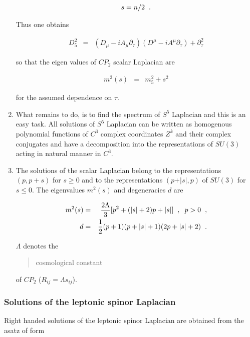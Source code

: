 \documentclass[10pt,epsf]{article}
\begin{document}
\begin{enumerate}
\begin{eqnarray}
 s=n/2\hspace{.2cm} .
 \end{eqnarray}
 
\noindent Thus one obtains

\begin{eqnarray} 
D^2_5 &=& (D_{\mu}- iA_{\mu}\partial_{\tau})(D^{\mu}- iA^{\mu}\partial_{\tau}) +\partial_{\tau}^2 
\end{eqnarray}

\noindent so that the eigen values of $CP_2$ scalar Laplacian are

\begin{eqnarray} m^2(s)&=& m_5^2 +s^2 
\end{eqnarray} 

\noindent for the assumed dependence on $\tau$.

\item What remains to do,  is to find the spectrum of $S^5$ Laplacian and this is an easy task.  All solutions of $S^5$ Laplacian can be written as homogenous polynomial functions of $C^3$ complex coordinates $Z^k$ and their complex conjugates and have a decomposition into the representations of $SU(3)$  acting in natural manner in $C^3$.



\item The solutions of the scalar Laplacian belong to the representations $(p,p+s)$ for $s\geq 0$ and to the representations $(p+ \vert s\vert, p)$ of $SU(3)$ for $s\leq 0$.  The eigenvalues  $m^2 (s)$ and degeneracies $d$ are

\begin{eqnarray} m^2(s)&=& \frac{2\Lambda}{3}[p^2+ (\vert s\vert +2) p + \vert s\vert] \hspace{.2cm} , \hspace{.2cm}  p>0\hspace{.2cm} , \nonumber\\ d&=& \frac{1}{2}(p+1)(p+ \vert s\vert +1)(2p+ \vert s\vert +2)\hspace{.2cm} . \end{eqnarray}


\noindent $\Lambda$ denotes the \blockquote{cosmological constant} of $CP_2$ ($R_{ij}= \Lambda s_{ij}$). 

\end{enumerate}


\subsubsection{Solutions of the leptonic spinor Laplacian}

Right handed solutions of the leptonic   spinor Laplacian are obtained from the  asatz of form 
\end{document}
